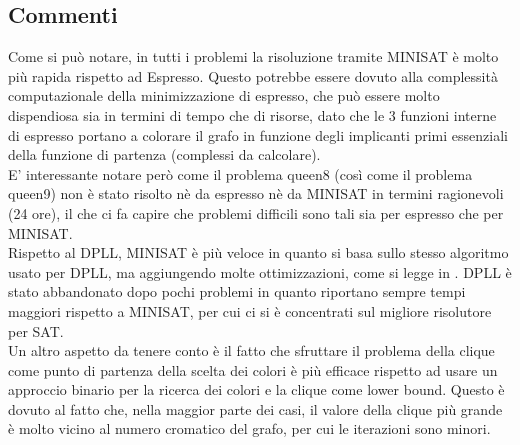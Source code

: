 \documentclass[a4paper,11pt]{article} %
\begin{document}


\subsection{Commenti}
Come si può notare, in tutti i problemi la risoluzione tramite MINISAT è molto più rapida rispetto ad Espresso. Questo potrebbe essere dovuto alla complessità computazionale della minimizzazione di espresso, che può essere molto dispendiosa sia in termini di tempo che di risorse, dato che le 3 funzioni interne di espresso portano a colorare il grafo in funzione degli implicanti primi essenziali della funzione di partenza (complessi da calcolare).\\
E' interessante notare però come il problema queen8 (così come il problema queen9) non è stato risolto nè da espresso nè da MINISAT in termini ragionevoli (24 ore), il che ci fa capire che problemi difficili sono tali sia per espresso che per MINISAT.\\
Rispetto al DPLL, MINISAT è più veloce in quanto si basa sullo stesso algoritmo usato per DPLL, ma aggiungendo molte ottimizzazioni, come si legge in \cite{minisat}. DPLL è stato abbandonato dopo pochi problemi in quanto riportano sempre tempi maggiori rispetto a MINISAT, per cui ci si è concentrati sul migliore risolutore per SAT.\\
Un altro aspetto da tenere conto è il fatto che sfruttare il problema della clique come punto di partenza della scelta dei colori è più efficace rispetto ad usare un approccio binario per la ricerca dei colori e la clique come lower bound. Questo è dovuto al fatto che, nella maggior parte dei casi, il valore della clique più grande è molto vicino al numero cromatico del grafo, per cui le iterazioni sono minori.

\pagebreak
\end{document}
